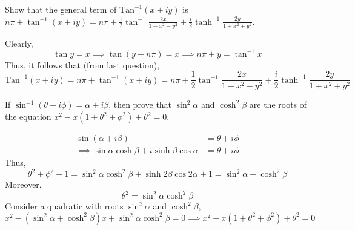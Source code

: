 \begin{asign}
	Show that the general term of $\text{Tan}^{-1}(x+iy)$ is $n\pi+\tan^{-1}(x+iy)=n\pi+\frac{1}{2}\tan^{-1}\frac{2x}{1-x^2-y^2}+\frac{i}{2}\tanh^{-1}\frac{2y}{1+x^2+y^2}$.
\end{asign}
\begin{anse}
	Clearly, 
	\[\tan y=x\implies \tan(y+n\pi)=x\implies n\pi+y=\tan^{-1}x\]
	Thus, it follows that (from last question),
	\[\text{Tan}^{-1}(x+iy)=n\pi+\tan^{-1}(x+iy)=n\pi+\frac{1}{2}\tan^{-1}\frac{2x}{1-x^2-y^2}+\frac{i}{2}\tanh^{-1}\frac{2y}{1+x^2+y^2}\]
\end{anse}
\begin{asign}
	If $\sin^{-1}(\theta+i\phi)=\alpha+i\beta$, then prove that $\sin^2\alpha$ and $\cosh^2\beta$ are the roots of the equation $x^2-x(1+\theta^2+\phi^2)+\theta^2=0$.
\end{asign}
\begin{anse}
	\[\begin{split}
		\sin(\alpha+i\beta)&=\theta+i\phi\\
		\implies \sin\alpha\cosh\beta+i\sinh\beta\cos\alpha&=\theta+i\phi
	\end{split}\]
	Thus,
	\[\theta^2+\phi^2+1=\sin^2\alpha\cosh^2\beta+\sinh2\beta\cos2\alpha+1=\sin^2\alpha+\cosh^2\beta\]
	Moreover,
	\[\theta^2=\sin^2\alpha\cosh^2\beta\]
	Consider a quadratic with roots $\sin^2\alpha$ and $\cosh^2\beta$,
	\[x^2-(\sin^2\alpha+\cosh^2\beta)x+\sin^2\alpha\cosh^2\beta=0\implies x^2-x(1+\theta^2+\phi^2)+\theta^2=0 \]
\end{anse}
